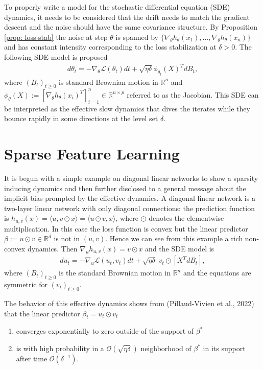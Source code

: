 To properly write a model for the stochastic differential equation (SDE)
dynamics, it needs to be considered that the drift needs to match the
gradient descent and the noise should have the same covariance structure. By
Proposition \ref{prop: loss-stab} the noise at step $\theta$ is spanned by
$\{\nabla_{\theta}h_{\theta}(x_1),\ldots,\nabla_{\theta}h_{\theta}(x_n)\}$
and has constant intensity corresponding to the loss stabilization at $\delta
>0$. The following SDE model is proposed
\begin{align}
    \label{eq: sde-sgd-dynamics}
    d\theta_t = -\nabla_{\theta} \mathcal{L}(\theta_t)dt + \sqrt{\eta\delta}
    \phi_{\theta_t}(X)^{T}dB_t,
\end{align}
where $(B_t)_{t\ge 0}$ is standard Brownian motion in $\mathbb{R}^{n}$ and
$\phi_{\theta}(X) := [\nabla_{\theta}h_{\theta}(x_i)^{T}]_{i=1}^{n} \in
\mathbb{R}^{n\times p}$ referred to as the Jacobian. This SDE can be
interpreted as the effective slow dynamics that dives the iterates while they
bounce rapidly in some directions at the level set $\delta$.
\section{Sparse Feature Learning}
It is begun with a simple example on diagonal linear networks to show a
sparsity inducing dynamics and then further disclosed to a general message
about the implicit bias prompted by the effective dynamics.
\newline
A diagonal linear network is a two-layer linear network with only diagonal
connections: the prediction function is $h_{u,v}(x) = \langle u, v \odot
x\rangle = \langle u \odot v, x\rangle$, where $\odot$ denotes the
elementwise multiplication. In this case the loss function is convex but the
linear predictor $\beta:=u\odot v \in \mathbb{R}^{d}$ is not in $(u, v)$.
Hence we can see from this example a rich non-convex dynamics. Then $\nabla_u
h_{u, v}(x) = v \odot x$  and the SDE model is
\begin{align}
    du_t = -\nabla_u \mathcal{L}(u_t, v_t) dt + \sqrt{\eta\delta}\; v_t \odot
    [X^{T}dB_t],
\end{align}
where $(B_t)_{t\ge 0}$ is the standard Brownian motion in $\mathbb{R}^{n}$
and the equations are symmetric for $(v_t)_{t\ge 0}$.

The behavior of this effective dynamics shows from (Pillaud-Vivien et al.,
2022) that the linear predictor $\beta_t = u_t \odot v_t$
\begin{enumerate}
    \item converges exponentially to zero outside of the support of $\beta^{*}$
    \item is with high probability in a $\mathcal{O}(\sqrt{\eta\delta})$
        neighborhood of $\beta^{*}$ in its support after time
        $\mathcal{O}( \delta^{-1})$.
\end{enumerate}

